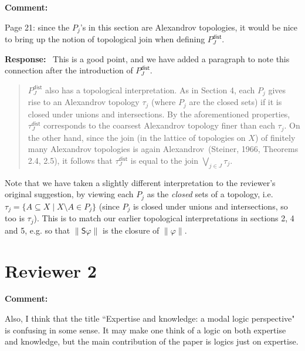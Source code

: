 \documentclass[12pt]{article}
\newenvironment{comment}{
    \noindent\textbf{Comment:}\
    \em
}{\vspace{5mm}}
\newenvironment{response}{
    \noindent\textbf{Response:}\
}{\vspace{5mm}}
\renewcommand{\phi}{\varphi}
\renewcommand{\S}{\mathsf{S}}
\begin{document}
\begin{comment}
    Page 21: since the $P_j$'s in this section are Alexandrov topologies, it
    would be nice to bring up the notion of topological join when defining
    $P^\mathsf{dist}_J$.
\end{comment}

\begin{response}
    This is a good point, and we have added a paragraph to note this connection
    after the introduction of $P^\mathsf{dist}_J$.

    \begin{quotation}
        $P^\mathsf{dist}_J$ also has a topological interpretation. As in
        Section 4, each $P_j$ gives rise to an Alexandrov topology $\tau_j$
        (where $P_j$ are the closed sets) if it is closed under unions and
        intersections. By the aforementioned properties, $\tau^\mathsf{dist}_J$
        corresponds to the coarsest Alexandrov topology finer than each
        $\tau_j$. On the other hand, since the join (in the lattice of
        topologies on $X$) of finitely many Alexandrov topologies is again
        Alexandrov~(Steiner, 1966, Theorems 2.4, 2.5), it follows that
        $\tau^\mathsf{dist}_J$ is equal to the join $\bigvee_{j \in
        J}{\tau_j}$.
    \end{quotation}

    Note that we have taken a slightly different interpretation to the
    reviewer's original suggestion, by viewing each $P_j$ as the \emph{closed}
    sets of a topology, i.e. $\tau_j = \{A \subseteq X \mid X \setminus A \in
    P_j\}$ (since $P_j$ is closed under unions and intersections, so too is
    $\tau_j$). This is to match our earlier topological interpretations in
    sections 2, 4 and 5, e.g. so that $\|\S\phi\|$ is the closure of
    $\|\phi\|$.

\end{response}

\section*{Reviewer 2}

\begin{comment}
     Also, I think that the title ``Expertise and knowledge: a modal logic
     perspective" is confusing in some sense. It may make one think of a logic
     on both expertise and knowledge, but the main contribution of the paper is
     logics just on expertise.
\end{comment}
\end{document}
